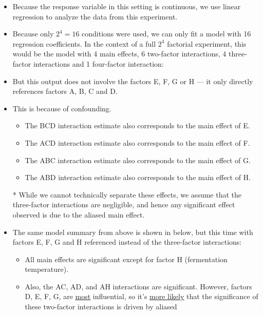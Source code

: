 \begin{itemize}
\begin{table}[!htbp]
\begin{tabular}{cccccccccc}
                  \end{tabular}
            \end{table}
      \item Because the response variable in this setting is continuous, we use linear regression to analyze the data
            from this experiment.
      \item Because only $2^4=16$ conditions were used, we can only fit a model with 16 regression coefficients. In
            the context of a full $2^4$ factorial experiment, this would be the model with 4 main effects, 6 two-factor
            interactions, 4 three-factor interactions and 1 four-factor interaction:
            
      \item But this output does not involve the factors E, F, G or H –-- it only directly references factors A, B, C
            and D.
      \item This is because of confounding.
            \begin{itemize}
                  \item The BCD interaction estimate also corresponds to the main effect of E.
                  \item The ACD interaction estimate also corresponds to the main effect of F.
                  \item The ABC interaction estimate also corresponds to the main effect of G.
                  \item The ABD interaction estimate also corresponds to the main effect of H.
            \end{itemize}
      \item[*] While we cannot technically separate these effects, we assume that the three-factor interactions are
            negligible, and hence any significant effect observed is due to the aliased main effect.
      \item The same model summary from above is shown in below, but this time with factors E, F, G and H
            referenced instead of the three-factor interactions:
            
            \begin{itemize}[*]
                  \item All main effects are significant except for factor H (fermentation temperature).
                  \item Also, the AC, AD, and AH interactions are significant. However, factors D, E, F, G, are \underline{most}
                        influential, so it's \underline{more likely} that the significance of these two-factor interactions is driven by aliased

\end{itemize}
\end{itemize}

